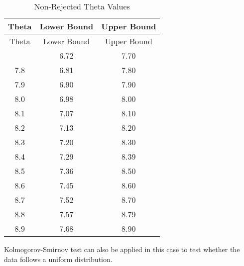 \documentclass[
]{article}
\begin{document}
\begin{longtable}[]{@{}ccc@{}}
\caption{Non-Rejected Theta Values}\tabularnewline
\toprule\noalign{}
Theta & Lower Bound & Upper Bound \\
\midrule\noalign{}
\endfirsthead
\toprule\noalign{}
Theta & Lower Bound & Upper Bound \\
\midrule\noalign{}
\endhead
\bottomrule\noalign{}
\endlastfoot
7.7 & 6.72 & 7.70 \\
7.8 & 6.81 & 7.80 \\
7.9 & 6.90 & 7.90 \\
8.0 & 6.98 & 8.00 \\
8.1 & 7.07 & 8.10 \\
8.2 & 7.13 & 8.20 \\
8.3 & 7.20 & 8.30 \\
8.4 & 7.29 & 8.39 \\
8.5 & 7.36 & 8.50 \\
8.6 & 7.45 & 8.60 \\
8.7 & 7.52 & 8.70 \\
8.8 & 7.57 & 8.79 \\
8.9 & 7.68 & 8.90 \\
\end{longtable}

Kolmogorov-Smirnov test can also be applied in this case to test whether
the data follows a uniform distribution.
\end{document}

